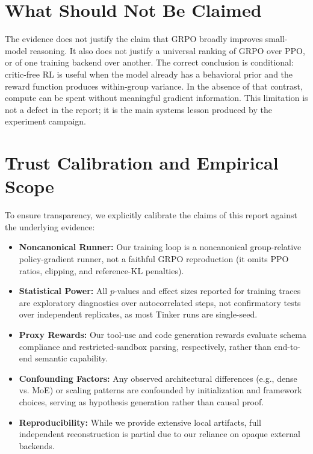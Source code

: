 \documentclass[12pt,a4paper]{report}
\begin{document}
\section{What Should Not Be Claimed}
\label{sec:not-claimed}

The evidence does not justify the claim that GRPO broadly improves small-model reasoning. It also does not justify a universal ranking of GRPO over PPO, or of one training backend over another. The correct conclusion is conditional: critic-free RL is useful when the model already has a behavioral prior and the reward function produces within-group variance. In the absence of that contrast, compute can be spent without meaningful gradient information. This limitation is not a defect in the report; it is the main systems lesson produced by the experiment campaign.



\section*{Trust Calibration and Empirical Scope}
To ensure transparency, we explicitly calibrate the claims of this report against the underlying evidence:
\begin{itemize}
    \item \textbf{Noncanonical Runner:} Our training loop is a noncanonical group-relative policy-gradient runner, not a faithful GRPO reproduction (it omits PPO ratios, clipping, and reference-KL penalties).
    \item \textbf{Statistical Power:} All $p$-values and effect sizes reported for training traces are exploratory diagnostics over autocorrelated steps, not confirmatory tests over independent replicates, as most Tinker runs are single-seed.
    \item \textbf{Proxy Rewards:} Our tool-use and code generation rewards evaluate schema compliance and restricted-sandbox parsing, respectively, rather than end-to-end semantic capability.
    \item \textbf{Confounding Factors:} Any observed architectural differences (e.g., dense vs. MoE) or scaling patterns are confounded by initialization and framework choices, serving as hypothesis generation rather than causal proof.
    \item \textbf{Reproducibility:} While we provide extensive local artifacts, full independent reconstruction is partial due to our reliance on opaque external backends.
\end{itemize}
\end{document}
